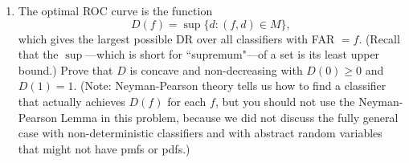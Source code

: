 \documentclass[11pt]{report}
\begin{document}
\begin{enumerate}[1.]
\begin{enumerate}
		      \item The optimal ROC curve is the function
		            \[ D(f) = \sup \{d : (f,d)\in M\}  , \]
		            which gives the largest possible DR over all classifiers with FAR $=f$.
		            (Recall that the $\sup$---which is short for ``supremum"---of a set is its least upper bound.)
		            Prove that $D$ is concave and non-decreasing with $D(0)\geq 0$ and $D(1)=1$. (Note: Neyman-Pearson theory tells us how to find a classifier that actually achieves $D(f)$ for each $f$, but you should not use the Neyman-Pearson Lemma in this problem, because we did not discuss the fully general case with non-deterministic classifiers and with abstract random variables that might not have pmfs or pdfs.)
	      \end{enumerate}



	      \pagebreak



\end{enumerate}
\end{document}

